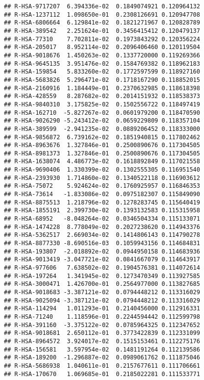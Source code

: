 \documentclass[
]{article}
\begin{document}
\begin{verbatim}
## R-HSA-9717207  6.394336e-02  0.1849074921 0.120964132
## R-HSA-1237112  1.098650e-01  0.2308126691 0.120947708
## R-HSA-6806664  6.129841e-02  0.1821271967 0.120828789
## R-HSA-389542   2.251624e-01  0.3456415412 0.120479137
## R-HSA-77310    7.702811e-02  0.1973843292 0.120356224
## R-HSA-205017   8.952114e-02  0.2096406460 0.120119504
## R-HSA-9018676  1.450263e-02  0.1337720000 0.119269366
## R-HSA-9645135  3.951476e-02  0.1584769382 0.118962183
## R-HSA-159854   5.833260e-02  0.1772597599 0.118927160
## R-HSA-5683826  5.296471e-02  0.1718167290 0.118852015
## R-HSA-2160916  1.184449e-01  0.2370632985 0.118618398
## R-HSA-428559   8.287682e-02  0.2014151932 0.118538373
## R-HSA-9840310  3.175825e-02  0.1502556722 0.118497419
## R-HSA-162710  -5.827267e-02  0.0601979200 0.118470590
## R-HSA-9026290 -5.243412e-02  0.0659229809 0.118357104
## R-HSA-389599  -2.941235e-02  0.0889206452 0.118333000
## R-HSA-9856872  6.739162e-02  0.1851940815 0.117802462
## R-HSA-8963676  1.327846e-01  0.2500890676 0.117304505
## R-HSA-8981373  1.327846e-01  0.2500890676 0.117304505
## R-HSA-1638074  4.486773e-02  0.1618892849 0.117021558
## R-HSA-9690406  1.330399e-02  0.1302555305 0.116951540
## R-HSA-2393930  1.714860e-02  0.1340522118 0.116903612
## R-HSA-75072    5.924624e-02  0.1760925957 0.116846353
## R-HSA-73614   -1.833086e-02  0.0975182307 0.115849090
## R-HSA-8875513  1.218796e-02  0.1278283745 0.115640419
## R-HSA-1855191  2.399730e-02  0.1393132583 0.115315958
## R-HSA-68952   -8.048264e-02  0.0346504334 0.115133071
## R-HSA-1474228  8.778049e-02  0.2027238620 0.114943376
## R-HSA-5362517  2.669034e-02  0.1414806143 0.114790278
## R-HSA-8877330 -8.690516e-03  0.1059943156 0.114684831
## R-HSA-193807  -2.018892e-02  0.0944950158 0.114683936
## R-HSA-9013419 -3.047721e-02  0.0841667079 0.114643917
## R-HSA-977606   7.638502e-02  0.1904576381 0.114072614
## R-HSA-197264   1.341945e-02  0.1273470349 0.113927585
## R-HSA-3000471  1.426700e-01  0.2564977000 0.113827685
## R-HSA-9018683 -3.387121e-02  0.0794448212 0.113316029
## R-HSA-9025094 -3.387121e-02  0.0794448212 0.113316029
## R-HSA-114294   1.011293e-01  0.2140456000 0.112916331
## R-HSA-71240    1.118596e-01  0.2244594442 0.112599798
## R-HSA-391160  -3.375122e-02  0.0785964325 0.112347652
## R-HSA-9018681  2.650112e-01  0.3773422839 0.112331099
## R-HSA-8964572  3.924017e-02  0.1515153461 0.112275176
## R-HSA-156581   3.597954e-02  0.1481191264 0.112139586
## R-HSA-189200  -1.296887e-02  0.0989061762 0.111875046
## R-HSA-5686938  1.040611e-01  0.2157677611 0.111706661
## R-HSA-170670   1.069685e-01  0.2185022281 0.111533771

\end{verbatim}
\end{document}
